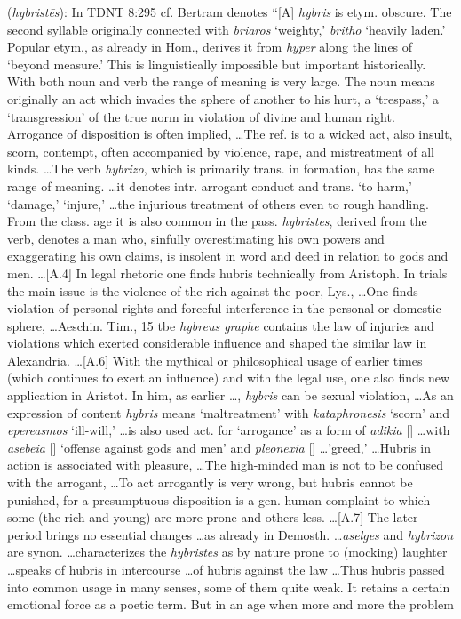 \item[Hubris,]

(\textit{hybristēs}):
In TDNT 8:295 cf. Bertram denotes ``[A] \emph{hybris} is etym. obscure. The second syllable originally connected with \emph{briaros} `weighty,' \emph{britho} `heavily laden.' Popular etym., as already in Hom., derives it from \emph{hyper} along the lines of `beyond measure.' This is linguistically impossible but important historically. With both noun and verb the range of meaning is very large. The noun means originally an act which invades the sphere of another to his hurt, a `trespass,' a `transgression' of the true norm in violation of divine and human right. Arrogance of disposition is often implied, \ldots The ref. is to a wicked act, also insult, scorn, contempt, often accompanied by violence, rape, and mistreatment of all kinds. \ldots The verb \emph{hybrizo}, which is primarily trans. in formation, has the same range of meaning. \ldots it denotes intr. arrogant conduct and trans. `to harm,' `damage,' `injure,' \ldots the injurious treatment of others even to rough handling. From the class. age it is also common in the pass. \emph{hybristes}, derived from the verb, denotes a man who, sinfully overestimating his own powers and exaggerating his own claims, is insolent in word and deed in relation to gods and men. \ldots [A.4] In legal rhetoric one finds hubris technically from Aristoph. In trials the main issue is the violence of the rich against the poor, Lys., \ldots One finds violation of personal rights and forceful interference in the personal or domestic sphere, \ldots Aeschin. Tim., 15 tbe \emph{hybreus graphe} contains the law of injuries and violations which exerted considerable influence and shaped the similar law in Alexandria. \ldots [A.6] With the mythical or philosophical usage of earlier times  (which continues to exert an influence) and with the legal use, one also finds new application in Aristot. In him, as earlier \ldots, \emph{hybris} can be sexual violation, \ldots As an expression of content \emph{hybris} means `maltreatment' with \emph{kataphronesis} `scorn' and \emph{epereasmos} `ill-will,' \ldots is also used act. for `arrogance' as a form of \emph{adikia} [] \ldots with \emph{asebeia} [] `offense against gods and men' and \emph{pleonexia} [] \ldots 'greed,' \ldots Hubris in action is associated with pleasure, \ldots The high-minded man is not to be confused with the arrogant, \ldots To act arrogantly is very wrong, but hubris cannot be punished, for a presumptuous disposition is a gen. human complaint to which some  (the rich and young) are more prone and others less. \ldots [A.7] The later period brings no essential changes \ldots as already in Demosth. \ldots \emph{aselges} and \emph{hybrizon} are synon. \ldots characterizes the \emph{hybristes} as by nature prone to (mocking) laughter \ldots speaks of hubris in intercourse \ldots of hubris against the law \ldots Thus hubris passed into common usage in many senses, some of them quite weak. It retains a certain emotional force as a poetic term. But in an age when more and more the problem 